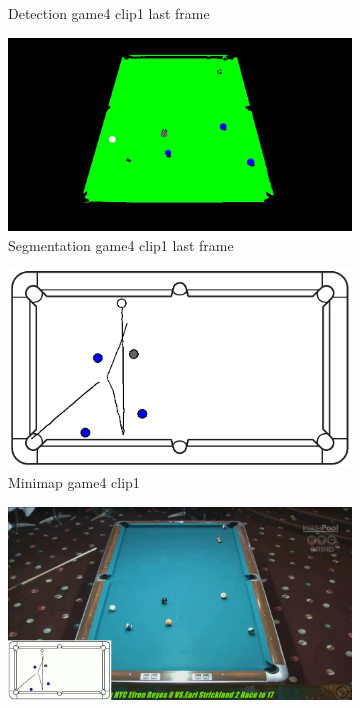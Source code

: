 \begin{figure}[H]
\begin{subfigure}[b]{0.48\textwidth}
        \caption{Detection game4 clip1 last frame}
        \label{fig: game4_clip1_last_frame_detected}
    \end{subfigure}
    \begin{subfigure}[b]{0.48\textwidth}
        \centering
        \includegraphics[width=\textwidth]{images/Segmentation/game4_clip1_segmented_balls_last_frame.jpg}
        \caption{Segmentation game4 clip1 last frame}
		\label{fig: game4_clip1_last_frame_segmented}
    \end{subfigure}
    \begin{subfigure}[b]{0.48\textwidth}
    	\centering
    	\includegraphics[width=\textwidth]{images/AllMinimap/game4_clip1_minimap.png}
    	\caption{Minimap game4 clip1}
    	\label{fig: game4_clip1_minimap}
    \end{subfigure}
    \begin{subfigure}[b]{0.48\textwidth}
    	\centering
    	\includegraphics[width=\textwidth]{images/Video/game4_clip1_video.jpg}

\end{subfigure}
\end{figure}
